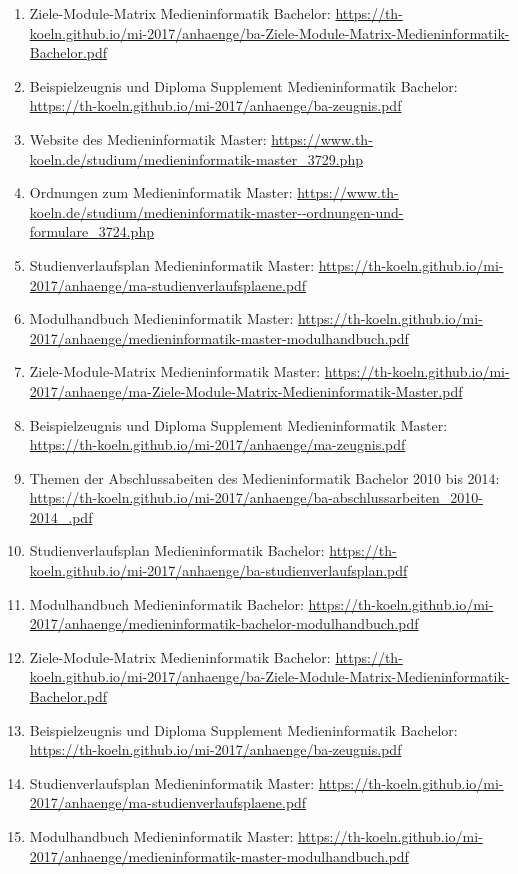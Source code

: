 \documentclass[BCOR12mm,DIV11,titlepage,a4paper,oneside,10pt]{scrbook}
\begin{document}
\begin{sloppypar}
\begin{flushleft}
\begin{enumerate}
\item{Ziele-Module-Matrix Medieninformatik Bachelor: \url{https://th-koeln.github.io/mi-2017/anhaenge/ba-Ziele-Module-Matrix-Medieninformatik-Bachelor.pdf} } 
\item{Beispielzeugnis und Diploma Supplement Medieninformatik Bachelor: \url{https://th-koeln.github.io/mi-2017/anhaenge/ba-zeugnis.pdf} } 
\item{Website des Medieninformatik Master: \url{https://www.th-koeln.de/studium/medieninformatik-master\_3729.php} } 
\item{Ordnungen zum Medieninformatik Master: \url{https://www.th-koeln.de/studium/medieninformatik-master--ordnungen-und-formulare\_3724.php} } 
\item{Studienverlaufsplan Medieninformatik Master: \url{https://th-koeln.github.io/mi-2017/anhaenge/ma-studienverlaufsplaene.pdf} } 
\item{Modulhandbuch Medieninformatik Master: \url{https://th-koeln.github.io/mi-2017/anhaenge/medieninformatik-master-modulhandbuch.pdf} } 
\item{Ziele-Module-Matrix Medieninformatik Master: \url{https://th-koeln.github.io/mi-2017/anhaenge/ma-Ziele-Module-Matrix-Medieninformatik-Master.pdf} } 
\item{Beispielzeugnis und Diploma Supplement Medieninformatik Master: \url{https://th-koeln.github.io/mi-2017/anhaenge/ma-zeugnis.pdf} } 
\item{Themen der Abschlussabeiten des Medieninformatik Bachelor 2010 bis 2014: \url{https://th-koeln.github.io/mi-2017/anhaenge/ba-abschlussarbeiten\_2010-2014\_.pdf} } 
\item{Studienverlaufsplan Medieninformatik Bachelor: \url{https://th-koeln.github.io/mi-2017/anhaenge/ba-studienverlaufsplan.pdf} } 
\item{Modulhandbuch Medieninformatik Bachelor: \url{https://th-koeln.github.io/mi-2017/anhaenge/medieninformatik-bachelor-modulhandbuch.pdf} } 
\item{Ziele-Module-Matrix Medieninformatik Bachelor: \url{https://th-koeln.github.io/mi-2017/anhaenge/ba-Ziele-Module-Matrix-Medieninformatik-Bachelor.pdf} } 
\item{Beispielzeugnis und Diploma Supplement Medieninformatik Bachelor: \url{https://th-koeln.github.io/mi-2017/anhaenge/ba-zeugnis.pdf} } 
\item{Studienverlaufsplan Medieninformatik Master: \url{https://th-koeln.github.io/mi-2017/anhaenge/ma-studienverlaufsplaene.pdf} } 
\item{Modulhandbuch Medieninformatik Master: \url{https://th-koeln.github.io/mi-2017/anhaenge/medieninformatik-master-modulhandbuch.pdf} } 

\end{enumerate}
\end{flushleft}
\end{sloppypar}
\end{document}
